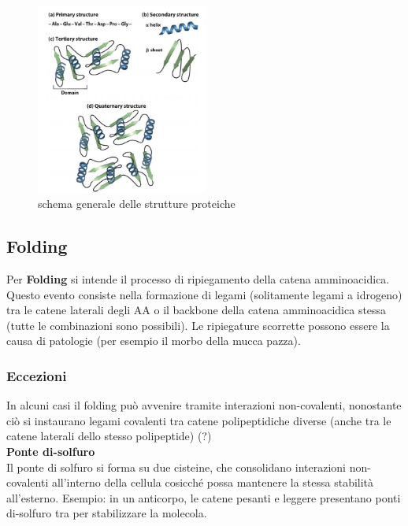           \begin{figure}[h]
            \centering
            \includegraphics[width=0.5\textwidth]{images/proteinegerarchia.JPG}
            \caption{\small schema generale delle strutture proteiche}
            \label{fig:mesh1}
        \end{figure}
    
    \subsection{Folding}
        \small
        Per \textbf{Folding} si intende il processo di ripiegamento della catena amminoacidica. Questo evento consiste nella formazione di legami (solitamente legami a idrogeno) tra le catene laterali degli AA o il backbone della catena amminoacidica stessa (tutte le combinazioni sono possibili).
        Le ripiegature scorrette possono essere la causa di patologie (per esempio il morbo della mucca pazza).
    
        \subsubsection{Eccezioni}
            In alcuni casi il folding può avvenire tramite interazioni non-covalenti, nonostante ciò si instaurano legami covalenti tra catene polipeptidiche diverse (anche tra le catene laterali dello stesso polipeptide) (?)\\
            
            \textbf{Ponte di-solfuro}  \\
            Il ponte di solfuro si forma su due cisteine, che consolidano interazioni non-covalenti all'interno della cellula cosicché possa mantenere la stessa stabilità all'esterno.
            Esempio: in un anticorpo, le catene pesanti e leggere presentano ponti di-solfuro tra per stabilizzare la molecola.
    
